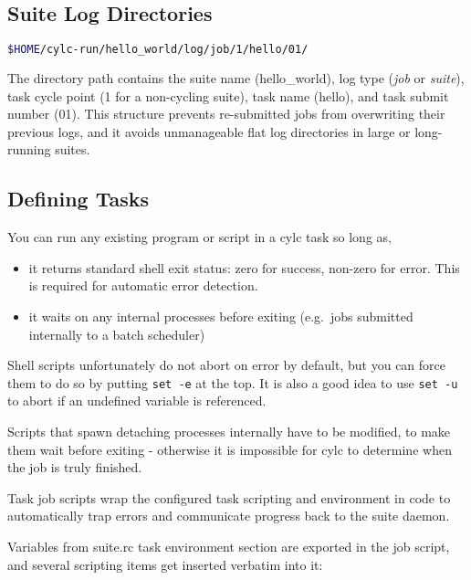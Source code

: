 \subsection{Suite Log Directories}

\begin{lstlisting}[language=bash]
$HOME/cylc-run/hello_world/log/job/1/hello/01/
\end{lstlisting}

The directory path contains the suite name (hello\_world), log type ({\em job}
or {\em suite}), task cycle point (1 for a non-cycling suite), task name
(hello), and task submit number (01). This structure prevents re-submitted jobs
from overwriting their previous logs, and it avoids unmanageable flat log
directories in large or long-running suites.

\subsection{Defining Tasks}

You can run any existing program or script in a cylc task so long as,
\begin{itemize}
    \item it returns standard shell exit status: zero for success, non-zero
        for error.  This is required for automatic error detection.
    \item it waits on any internal processes before exiting (e.g.\ jobs
        submitted internally to a batch scheduler)
\end{itemize}

Shell scripts unfortunately do not abort on error by default, but you can force them
to do so by putting \lstinline=set -e= at the top.  It is also a good idea to use
\lstinline=set -u= to abort if an undefined variable is referenced. 

Scripts that spawn detaching processes internally have to be modified, to make
them wait before exiting - otherwise it is impossible for cylc to determine
when the job is truly finished.


Task job scripts wrap the configured task scripting and environment in
code to automatically trap errors and communicate progress back to the
suite daemon.

Variables from suite.rc task environment section are exported in the job script, and
several scripting items get inserted verbatim into it:

